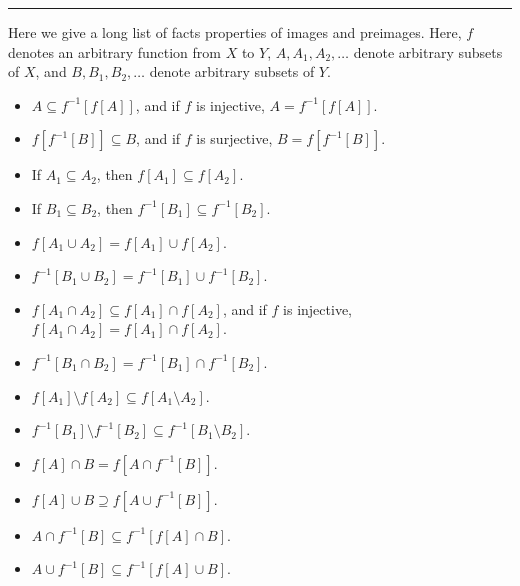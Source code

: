 \documentclass[letterpaper,10pt,english]{sphinxmanual}
\begin{document}
\bigskip\hrule\bigskip


\sphinxAtStartPar
Here we give a long list of facts properties of images and preimages. Here, \(f\) denotes an arbitrary function from \(X\) to \(Y\), \(A, A_1, A_2, \ldots\) denote arbitrary subsets of \(X\), and \(B, B_1, B_2, \ldots\) denote arbitrary subsets of \(Y\).
\begin{itemize}
\item {} 
\sphinxAtStartPar
\(A \subseteq f^{-1}[f[A]]\), and if \(f\) is injective, \(A = f^{-1}[f[A]]\).

\item {} 
\sphinxAtStartPar
\(f[f^{-1}[B]] \subseteq B\), and if \(f\) is surjective, \(B = f[f^{-1}[B]]\).

\item {} 
\sphinxAtStartPar
If \(A_1 \subseteq A_2\), then \(f[A_1] \subseteq f[A_2]\).

\item {} 
\sphinxAtStartPar
If \(B_1 \subseteq B_2\), then \(f^{-1}[B_1] \subseteq f^{-1}[B_2]\).

\item {} 
\sphinxAtStartPar
\(f[A_1 \cup A_2] = f[A_1] \cup f[A_2]\).

\item {} 
\sphinxAtStartPar
\(f^{-1}[B_1 \cup B_2] = f^{-1}[B_1] \cup f^{-1}[B_2]\).

\item {} 
\sphinxAtStartPar
\(f[A_1 \cap A_2] \subseteq f[A_1] \cap f[A_2]\), and if \(f\) is injective, \(f[A_1 \cap A_2] = f[A_1] \cap f[A_2]\).

\item {} 
\sphinxAtStartPar
\(f^{-1}[B_1 \cap B_2] = f^{-1}[B_1] \cap f^{-1}[B_2]\).

\item {} 
\sphinxAtStartPar
\(f[A_1] \setminus f[A_2] \subseteq f[A_1 \setminus A_2]\).

\item {} 
\sphinxAtStartPar
\(f^{-1}[B_1] \setminus f^{-1}[B_2] \subseteq f^{-1}[B_1 \setminus B_2]\).

\item {} 
\sphinxAtStartPar
\(f[A] \cap B = f[A \cap f^{-1}[B]]\).

\item {} 
\sphinxAtStartPar
\(f[A] \cup B \supseteq f[A \cup f^{-1}[B]]\).

\item {} 
\sphinxAtStartPar
\(A \cap f^{-1}[B] \subseteq f^{-1}[f[A] \cap B]\).

\item {} 
\sphinxAtStartPar
\(A \cup f^{-1}[B] \subseteq f^{-1}[f[A] \cup B]\).

\end{itemize}
\end{document}
